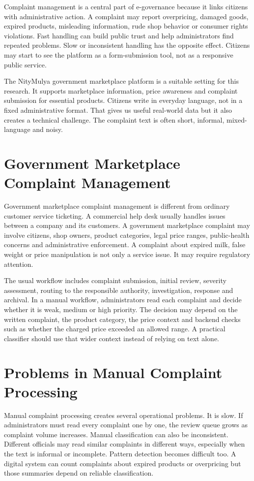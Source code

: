 \documentclass[12pt,a4paper,openany]{book}
\begin{document}
Complaint management is a central part of e-governance because it links citizens with administrative action. A complaint may report overpricing, damaged goods, expired products, misleading information, rude shop behavior or consumer rights violations. Fast handling can build public trust and help administrators find repeated problems. Slow or inconsistent handling has the opposite effect. Citizens may start to see the platform as a form-submission tool, not as a responsive public service.

The NityMulya government marketplace platform is a suitable setting for this research. It supports marketplace information, price awareness and complaint submission for essential products. Citizens write in everyday language, not in a fixed administrative format. That gives us useful real-world data but it also creates a technical challenge. The complaint text is often short, informal, mixed-language and noisy.

\section{Government Marketplace Complaint Management}
Government marketplace complaint management is different from ordinary customer service ticketing. A commercial help desk usually handles issues between a company and its customers. A government marketplace complaint may involve citizens, shop owners, product categories, legal price ranges, public-health concerns and administrative enforcement. A complaint about expired milk, false weight or price manipulation is not only a service issue. It may require regulatory attention.

The usual workflow includes complaint submission, initial review, severity assessment, routing to the responsible authority, investigation, response and archival. In a manual workflow, administrators read each complaint and decide whether it is weak, medium or high priority. The decision may depend on the written complaint, the product category, the price context and backend checks such as whether the charged price exceeded an allowed range. A practical classifier should use that wider context instead of relying on text alone.

\section{Problems in Manual Complaint Processing}
Manual complaint processing creates several operational problems. It is slow. If administrators must read every complaint one by one, the review queue grows as complaint volume increases. Manual classification can also be inconsistent. Different officials may read similar complaints in different ways, especially when the text is informal or incomplete. Pattern detection becomes difficult too. A digital system can count complaints about expired products or overpricing but those summaries depend on reliable classification.
\end{document}
